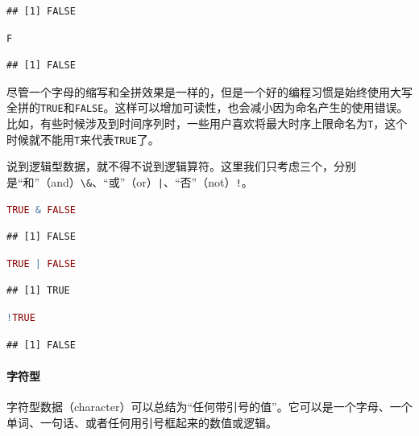 \documentclass[]{ctexbook}
\let\oldparagraph\paragraph
\renewcommand{\paragraph}[1]{\oldparagraph{#1}\mbox{}}
\newcommand{\passthrough}[1]{#1}
\begin{document}
\begin{lstlisting}
## [1] FALSE
\end{lstlisting}

\begin{lstlisting}[language=R]
F
\end{lstlisting}

\begin{lstlisting}
## [1] FALSE
\end{lstlisting}

尽管一个字母的缩写和全拼效果是一样的，但是一个好的编程习惯是始终使用大写全拼的\passthrough{\lstinline!TRUE!}和\passthrough{\lstinline!FALSE!}。这样可以增加可读性，也会减小因为命名产生的使用错误。比如，有些时候涉及到时间序列时，一些用户喜欢将最大时序上限命名为\passthrough{\lstinline!T!}，这个时候就不能用\passthrough{\lstinline!T!}来代表\passthrough{\lstinline!TRUE!}了。

说到逻辑型数据，就不得不说到逻辑算符。这里我们只考虑三个，分别是``和''（and）\passthrough{\lstinline!\&!}、``或''（or）\passthrough{\lstinline!|!}、``否''（not）\passthrough{\lstinline"!"}。

\begin{lstlisting}[language=R]
TRUE & FALSE
\end{lstlisting}

\begin{lstlisting}
## [1] FALSE
\end{lstlisting}

\begin{lstlisting}[language=R]
TRUE | FALSE
\end{lstlisting}

\begin{lstlisting}
## [1] TRUE
\end{lstlisting}

\begin{lstlisting}[language=R]
!TRUE
\end{lstlisting}

\begin{lstlisting}
## [1] FALSE
\end{lstlisting}

\hypertarget{ux5b57ux7b26ux578b}{%
\paragraph{字符型}\label{ux5b57ux7b26ux578b}}

字符型数据（character）可以总结为``任何带引号的值''。它可以是一个字母、一个单词、一句话、或者任何用引号框起来的数值或逻辑。
\end{document}
